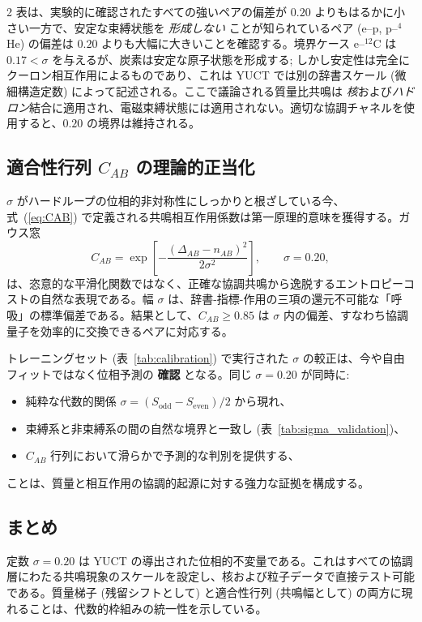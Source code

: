 \documentclass[11pt,a4paper]{article}
\theoremstyle{remark}
\begin{document}
\begin{multicols}{2}
		表は、実験的に確認されたすべての強いペアの偏差が $0.20$ よりもはるかに小さい一方で、安定な束縛状態を \emph{形成しない} ことが知られているペア (e--p, p--$^4$He) の偏差は $0.20$ よりも大幅に大きいことを確認する。境界ケース e--$^{12}$C は $0.17 < \sigma$ を与えるが、炭素は安定な原子状態を形成する; しかし安定性は完全にクーロン相互作用によるものであり、これは YUCT では別の辞書スケール (微細構造定数) によって記述される。ここで議論される質量比共鳴は \emph{核}および\emph{ハドロン}結合に適用され、電磁束縛状態には適用されない。適切な協調チャネルを使用すると、$0.20$ の境界は維持される。
		
		\subsection{適合性行列 \(C_{AB}\) の理論的正当化}
		
		$\sigma$ がハードループの位相的非対称性にしっかりと根ざしている今、式~(\ref{eq:CAB}) で定義される共鳴相互作用係数は第一原理的意味を獲得する。ガウス窓
		\[
		C_{AB} = \exp\!\left[ -\frac{(\Delta_{AB} - n_{AB})^2}{2\sigma^2} \right],\qquad \sigma = 0.20,
		\]
		は、恣意的な平滑化関数ではなく、正確な協調共鳴から逸脱するエントロピーコストの自然な表現である。幅 $\sigma$ は、辞書-指標-作用の三項の還元不可能な「呼吸」の標準偏差である。結果として、$C_{AB} \ge 0.85$ は $\sigma$ 内の偏差、すなわち協調量子を効率的に交換できるペアに対応する。
		
		トレーニングセット (表~\ref{tab:calibration}) で実行された $\sigma$ の較正は、今や自由フィットではなく位相予測の \textbf{確認} となる。同じ $\sigma = 0.20$ が同時に:
		\begin{itemize}
			\item 純粋な代数的関係 $\sigma = (S_{\mathrm{odd}} - S_{\mathrm{even}})/2$ から現れ、
			\item 束縛系と非束縛系の間の自然な境界と一致し (表~\ref{tab:sigma_validation})、
			\item $C_{AB}$ 行列において滑らかで予測的な判別を提供する、
		\end{itemize}
		ことは、質量と相互作用の協調的起源に対する強力な証拠を構成する。
		
		\subsection{まとめ}
		定数 $\sigma = 0.20$ は YUCT の導出された位相的不変量である。これはすべての協調層にわたる共鳴現象のスケールを設定し、核および粒子データで直接テスト可能である。質量梯子 (残留シフトとして) と適合性行列 (共鳴幅として) の両方に現れることは、代数的枠組みの統一性を示している。
		

\end{multicols}
\end{document}

